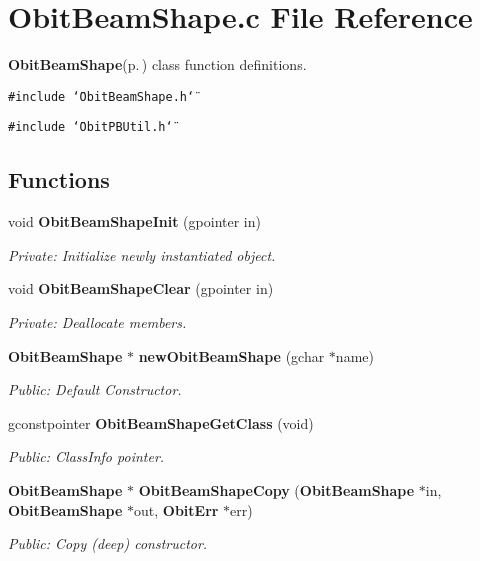 \section{Obit\-Beam\-Shape.c File Reference}
\label{ObitBeamShape_8c}
{\bf Obit\-Beam\-Shape}{\rm (p.\,\pageref{structObitBeamShape})} class function definitions. 

{\tt \#include \char`\"{}Obit\-Beam\-Shape.h\char`\"{}}\par
{\tt \#include \char`\"{}Obit\-PBUtil.h\char`\"{}}\par
\subsection*{Functions}
\begin{CompactItemize}
\item 
void {\bf Obit\-Beam\-Shape\-Init} (gpointer in)
\begin{CompactList}\small\item\em Private: Initialize newly instantiated object. \item\end{CompactList}\item 
void {\bf Obit\-Beam\-Shape\-Clear} (gpointer in)
\begin{CompactList}\small\item\em Private: Deallocate members. \item\end{CompactList}\item 
{\bf Obit\-Beam\-Shape} $\ast$ {\bf new\-Obit\-Beam\-Shape} (gchar $\ast$name)
\begin{CompactList}\small\item\em Public: Default Constructor. \item\end{CompactList}\item 
gconstpointer {\bf Obit\-Beam\-Shape\-Get\-Class} (void)
\begin{CompactList}\small\item\em Public: Class\-Info pointer. \item\end{CompactList}\item 
{\bf Obit\-Beam\-Shape} $\ast$ {\bf Obit\-Beam\-Shape\-Copy} ({\bf Obit\-Beam\-Shape} $\ast$in, {\bf Obit\-Beam\-Shape} $\ast$out, {\bf Obit\-Err} $\ast$err)
\begin{CompactList}\small\item\em Public: Copy (deep) constructor. \item\end{CompactList}\item 

\end{CompactItemize}

